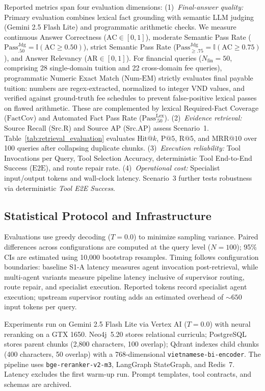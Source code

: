 Reported metrics span four evaluation dimensions:
(1)~\emph{Final-answer quality:} Primary evaluation combines lexical fact grounding with semantic LLM judging (Gemini 2.5 Flash Lite) and programmatic arithmetic checks. We measure continuous Answer Correctness ($\text{AC} \in [0, 1]$), moderate Semantic Pass Rate ($\text{Pass}_{.50}^{\text{Jdg}} = \mathbb{I}(\text{AC} \ge 0.50)$), strict Semantic Pass Rate ($\text{Pass}_{\ge .75}^{\text{Jdg}} = \mathbb{I}(\text{AC} \ge 0.75)$), and Answer Relevancy ($\text{AR} \in [0, 1]$). For financial queries ($N_{\text{fin}} = 50$, comprising 28 single-domain tuition and 22 cross-domain fee queries), programmatic Numeric Exact Match ($\text{Num-EM}$) strictly evaluates final payable tuition: numbers are regex-extracted, normalized to integer VND values, and verified against ground-truth fee schedules to prevent false-positive lexical passes on flawed arithmetic. These are complemented by lexical Required-Fact Coverage ($\text{FactCov}$) and Automated Fact Pass Rate ($\text{Pass}_{.50}^{\text{Lex}}$).
(2)~\emph{Evidence retrieval:} Source Recall ($\text{Src.R}$) and Source AP ($\text{Src.AP}$) assess Scenario~1. Table~\ref{tab:retrieval_evaluation} evaluates $\text{Hit}@k$, $\text{P}@5$, $\text{R}@5$, and $\text{MRR}@10$ over 100 queries after collapsing duplicate chunks.
(3)~\emph{Execution reliability:} Tool Invocations per Query, Tool Selection Accuracy, deterministic Tool End-to-End Success ($\text{E2E}$), and route repair rate.
(4)~\emph{Operational cost:} Specialist input/output tokens and wall-clock latency. Scenario~3 further tests robustness via deterministic \emph{Tool E2E Success}.

\subsection{Statistical Protocol and Infrastructure}
\label{sec:statistics}

Evaluations use greedy decoding ($T{=}0.0$) to minimize sampling variance. Paired differences across configurations are computed at the query level ($N{=}100$); 95\% CIs are estimated using 10,000 bootstrap resamples. Timing follows configuration boundaries: baseline S1-A latency measures agent invocation post-retrieval, while multi-agent variants measure pipeline latency inclusive of supervisor routing, route repair, and specialist execution. Reported tokens record specialist agent execution; upstream supervisor routing adds an estimated overhead of ${\sim}650$ input tokens per query.

Experiments run on Gemini 2.5 Flash Lite via Vertex AI ($T{=}0.0$) with neural reranking on a GTX 1650. Neo4j~5.20 stores relational curricula; PostgreSQL stores parent chunks (2,800 characters, 100 overlap); Qdrant indexes child chunks (400 characters, 50 overlap) with a 768-dimensional \texttt{vietnamese-\allowbreak bi-\allowbreak encoder}. The pipeline uses \texttt{bge-\allowbreak reranker-\allowbreak v2-\allowbreak m3}, LangGraph StateGraph, and Redis~7. Latency excludes the first warm-up run. Prompt templates, tool contracts, and schemas are archived.

